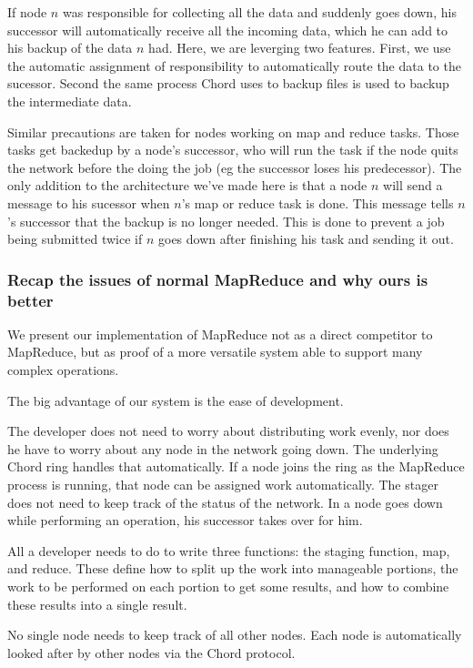 \documentclass[conference, compsocconf, letterpaper]{IEEEtran}
\begin{document}
If node $n$ was responsible for collecting all the data and suddenly goes down, his successor will automatically receive all the incoming data, which he can add to his backup of the data $n$ had.  Here, we are leverging two features. First,  we use the automatic assignment of responsibility to automatically route the data to the sucessor. Second the same process Chord uses to backup files is used to backup the intermediate data. 

Similar precautions are taken for nodes working on map and reduce tasks.  Those tasks get backedup  by a node's successor, who will run the task if the node quits the network before the doing the job (eg the successor loses his predecessor).   The only addition to the architecture we've made here is that a node $n$ will send a message to his sucessor when  $n$'s map or reduce task is done.  This message tells $n$'s successor that the backup is no longer needed.  This is done to prevent a job being submitted twice if $n$ goes down after finishing his task and sending it out.


\subsubsection{Recap the issues  of normal MapReduce  and why ours is better} 
We present our implementation of MapReduce not as a direct competitor to MapReduce, but as proof of a more versatile system able to support many complex operations.

The big advantage of our system is the ease of development.  

The developer does not need to worry about distributing work evenly, nor does he have to worry about any node in the network going down.  The underlying Chord ring handles that automatically.  If a node joins the ring as the MapReduce process is running, that node can be assigned work automatically.  The stager does not need to keep track of the status of the network.  In a node goes down while performing an operation, his successor takes over for him.

All a developer needs to do to write three functions: the staging function, map, and reduce.  These define how to split up the work into manageable portions,  the  work to be performed on each portion to get some results, and how to combine these results into a single result. 

No single node needs to keep track of all other nodes.  Each node is automatically looked after by  other nodes via the Chord protocol.  
\end{document}
